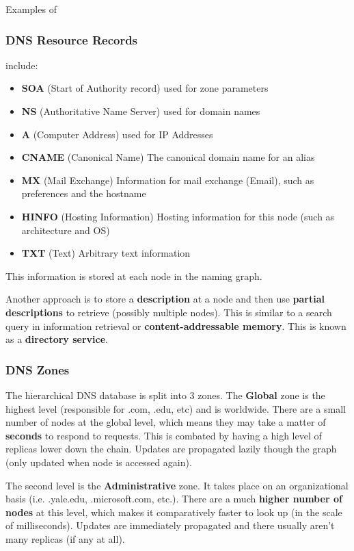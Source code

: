 \documentclass{article}
\begin{document}
Examples of \subsubsection {DNS Resource Records} include:
\begin{itemize}
    \item \textbf{SOA} (Start of Authority record) used for zone parameters
    \item \textbf{NS} (Authoritative Name Server) used for domain names
    \item \textbf{A} (Computer Address) used for IP Addresses
    \item \textbf{CNAME} (Canonical Name) The canonical domain name for an alias
    \item \textbf{MX} (Mail Exchange) Information for mail exchange (Email), such as preferences and the hostname
    \item \textbf{HINFO} (Hosting Information) Hosting information for this node (such as architecture and OS)
    \item \textbf{TXT} (Text) Arbitrary text information
\end{itemize}
This information is stored at each node in the naming graph.

Another approach is to store a \textbf{description} at a node and then use \textbf{partial descriptions} to retrieve (possibly multiple nodes). This is similar to a search query in information retrieval or \textbf{content-addressable memory}. This is known as a \textbf{directory service}.

\subsubsection{DNS Zones}

The hierarchical DNS database is split into 3 zones. The \textbf{Global} zone is the highest level (responsible for .com, .edu, etc) and is worldwide. There are a small number of nodes at the global level, which means they may take a matter of \textbf{seconds} to respond to requests. This is combated by having a high level of replicas lower down the chain. Updates are propagated lazily though the graph (only updated when node is accessed again).

The second level is the \textbf{Administrative} zone. It takes place on an organizational basis (i.e. .yale.edu, .microsoft.com, etc.). There are a much \textbf{higher number of nodes} at this level, which makes it comparatively faster to look up (in the scale of milliseconds). Updates are immediately propagated and there usually aren't many replicas (if any at all).
\end{document}
